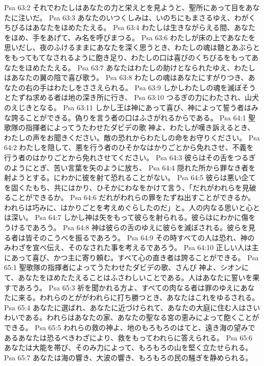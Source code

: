 Psa 63:2  それでわたしはあなたの力と栄えとを見ようと、聖所にあって目をあなたに注いだ。
Psa 63:3  あなたのいつくしみは、いのちにもまさるゆえ、わがくちびるはあなたをほめたたえる。
Psa 63:4  わたしは生きながらえる間、あなたをほめ、手をあげて、み名を呼びまつる。
Psa 63:6  わたしが床の上であなたを思いだし、夜のふけるままにあなたを深く思うとき、わたしの魂は髄とあぶらとをもってもてなされるように飽き足り、わたしの口は喜びのくちびるをもってあなたをほめたたえる。
Psa 63:7  あなたはわたしの助けとなられたゆえ、わたしはあなたの翼の陰で喜び歌う。
Psa 63:8  わたしの魂はあなたにすがりつき、あなたの右の手はわたしをささえられる。
Psa 63:9  しかしわたしの魂を滅ぼそうとたずね求める者は地の深き所に行き、
Psa 63:10  つるぎの力にわたされ、山犬のえじきとなる。
Psa 63:11  しかし王は神にあって喜び、神によって誓う者はみな誇ることができる。偽りを言う者の口はふさがれるからである。
Psa 64:1  聖歌隊の指揮者によってうたわせたダビデの歌 神よ、わたしが嘆き訴えるとき、わたしの声をお聞きください。敵の恐れからわたしの命をお守りください。
Psa 64:2  わたしを隠して、悪を行う者のひそかなはかりごとから免れさせ、不義を行う者のはかりごとから免れさせてください。
Psa 64:3  彼らはその舌をつるぎのようにとぎ、苦い言葉を矢のように放ち、
Psa 64:4  隠れた所から罪なき者を射ようとする。にわかに彼を射て恐れることがない。
Psa 64:5  彼らは悪い企てを固くたもち、共にはかり、ひそかにわなをかけて言う、「だれがわれらを見破ることができるか。
Psa 64:6  だれがわれらの罪をたずね出すことができるか。われらは巧みに、はかりごとを考えめぐらしたのだ」と。人の内なる思いと心とは深い。
Psa 64:7  しかし神は矢をもって彼らを射られる。彼らはにわかに傷をうけるであろう。
Psa 64:8  神は彼らの舌のゆえに彼らを滅ぼされる。彼らを見る者は皆そのこうべを振るであろう。
Psa 64:9  その時すべての人は恐れ、神のみわざを宣べ伝え、そのなされた事を考えるであろう。
Psa 64:10  正しい人は主にあって喜び、かつ主に寄り頼む。すべて心の直き者は誇ることができる。
Psa 65:1  聖歌隊の指揮者によってうたわせたダビデの歌、さんび 神よ、シオンにて、あなたをほめたたえることはふさわしいことである。人はあなたに誓いを果すであろう。
Psa 65:3  祈を聞かれる方よ、すべての肉なる者は罪のゆえにあなたに来る。われらのとががわれらに打ち勝つとき、あなたはこれをゆるされる。
Psa 65:4  あなたに選ばれ、あなたに近づけられて、あなたの大庭に住む人はさいわいである。われらはあなたの家、あなたの聖なる宮の恵みによって飽くことができる。
Psa 65:5  われらの救の神よ、地のもろもろのはてと、遠き海の望みであるあなたは恐るべきわざにより、救をもってわれらに答えられる。
Psa 65:6  あなたは大能を帯び、そのみ力によって、もろもろの山を堅く立たせられる。
Psa 65:7  あなたは海の響き、大波の響き、もろもろの民の騒ぎを静められる。
